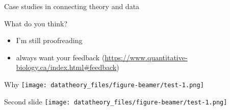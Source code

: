 \documentclass[
  ignorenonframetext,
]{beamer}
\providecommand{\tightlist}{%
  \setlength{\itemsep}{0pt}\setlength{\parskip}{0pt}}
\begin{document}
\begin{frame}{Case studies in connecting theory and data}
\begin{block}{What do you think?}
\protect\hypertarget{what-do-you-think}{}
\begin{itemize}
\tightlist
\item
  I'm still proofreading
\item
  always want your feedback
  (\url{https://www.quantitative-biology.ca/index.html\#feedback})
\end{itemize}
\end{block}

\begin{block}{Why}
\protect\hypertarget{why}{}
\texttt{[image: datatheory\_files/figure-beamer/test-1.png]}
\end{block}

\begin{block}{Second slide}
\protect\hypertarget{second-slide}{}
\texttt{[image: datatheory\_files/figure-beamer/test-1.png]}
\end{block}

\begin{block}{}
\protect\hypertarget{section-2}{}
\end{block}
\end{frame}
\end{document}
